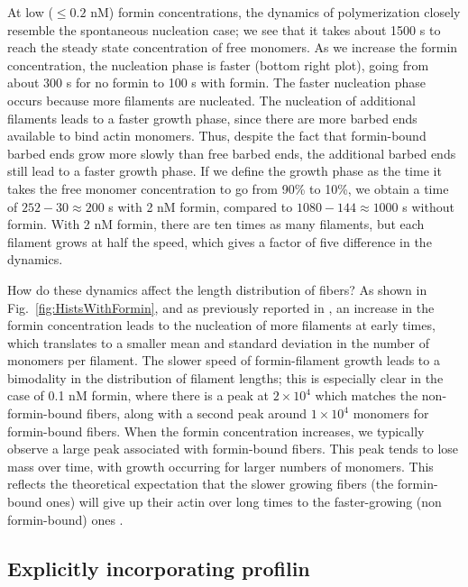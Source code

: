 \documentclass[11pt]{article}
\begin{document}
At low ($\leq 0.2$ nM) formin concentrations, the dynamics of polymerization closely resemble the spontaneous nucleation case; we see that it takes about 1500 s to reach the steady state concentration of free monomers. As we increase the formin concentration, the nucleation phase is faster (bottom right plot), going from about 300 s for no formin to 100 s with formin. The faster nucleation phase occurs because more filaments are nucleated. The nucleation of additional filaments leads to a faster growth phase, since there are more barbed ends available to bind actin monomers. Thus, despite the fact that formin-bound barbed ends grow more slowly than free barbed ends, the additional barbed ends still lead to a faster growth phase. If we define the growth phase as the time it takes the free monomer concentration to go from 90\% to 10\%, we obtain a time of $252-30\approx 200$ s with 2 nM formin, compared to $1080-144 \approx 1000$ s without formin. With 2 nM formin, there are ten times as many filaments, but each filament grows at half the speed, which gives a factor of five difference in the dynamics.

How do these dynamics affect the length distribution of fibers? As shown in Fig.\ \ref{fig:HistsWithFormin}, and as previously reported in \cite{banerjee2022emergence}, an increase in the formin concentration leads to the nucleation of more filaments at early times, which translates to a smaller mean and standard deviation in the number of monomers per filament. The slower speed of formin-filament growth leads to a bimodality in the distribution of filament lengths; this is especially clear in the case of 0.1 nM formin, where there is a peak at $2 \times 10^4$ which matches the non-formin-bound fibers, along with a second peak around $1 \times 10^4$ monomers for formin-bound fibers. When the formin concentration increases, we typically observe a large peak associated with formin-bound fibers. This peak tends to lose mass over time, with growth occurring for larger numbers of monomers. This reflects the theoretical expectation that the slower growing fibers (the formin-bound ones) will give up their actin over long times to the faster-growing (non formin-bound) ones \cite{mohapatra2017limiting}. 

\subsection{Explicitly incorporating profilin}
\end{document}

